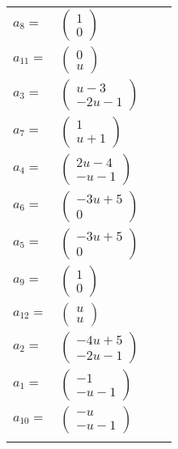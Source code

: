 \documentclass[1p]{elsarticle_modified}
\theoremstyle{definition}
\begin{document}
\begin{tabular}{m{7pt} m{180pt} m{7pt} m{180pt} }
\flushright $a_{8}=$&$\begin{pmatrix}1\\0\end{pmatrix}$ \\
\flushright $a_{11}=$&$\begin{pmatrix}0\\u\end{pmatrix}$ \\
\flushright $a_{3}=$&$\begin{pmatrix}u-3\\-2 u-1\end{pmatrix}$ \\
\flushright $a_{7}=$&$\begin{pmatrix}1\\u+1\end{pmatrix}$ \\
\flushright $a_{4}=$&$\begin{pmatrix}2 u-4\\- u-1\end{pmatrix}$ \\
\flushright $a_{6}=$&$\begin{pmatrix}-3 u+5\\0\end{pmatrix}$ \\
\flushright $a_{5}=$&$\begin{pmatrix}-3 u+5\\0\end{pmatrix}$ \\
\flushright $a_{9}=$&$\begin{pmatrix}1\\0\end{pmatrix}$ \\
\flushright $a_{12}=$&$\begin{pmatrix}u\\u\end{pmatrix}$ \\
\flushright $a_{2}=$&$\begin{pmatrix}-4 u+5\\-2 u-1\end{pmatrix}$ \\
\flushright $a_{1}=$&$\begin{pmatrix}-1\\- u-1\end{pmatrix}$ \\
\flushright $a_{10}=$&$\begin{pmatrix}- u\\- u-1\end{pmatrix}$\\&\end{tabular}
\end{document}
